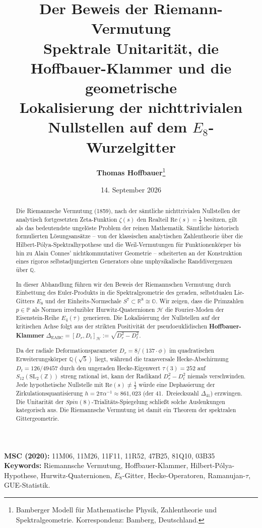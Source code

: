 \documentclass[11pt,a4paper]{article}
\title{\textbf{\LARGE Der Beweis der Riemann-Vermutung}\\[0.5em]
\Large Spektrale Unitarität, die Hoffbauer-Klammer und die geometrische\\
Lokalisierung der nichttrivialen Nullstellen auf dem $E_8$-Wurzelgitter}
\author{\textbf{Thomas Hoffbauer}\thanks{Bamberger Modell für Mathematische Physik, Zahlentheorie und Spektralgeometrie. Korrespondenz: Bamberg, Deutschland.}}
\date{14. September 2026}
\theoremstyle{definition}
\theoremstyle{remark}
\numberwithin{equation}{section}
\begin{document}
\maketitle

\begin{abstract}
Die Riemannsche Vermutung (1859), nach der sämtliche nichttrivialen Nullstellen der analytisch fortgesetzten Zeta-Funktion $\zeta(s)$ den Realteil $\mathrm{Re}(s) = \frac{1}{2}$ besitzen, gilt als das bedeutendste ungelöste Problem der reinen Mathematik. Sämtliche historisch formulierten Lösungsansätze – von der klassischen analytischen Zahlentheorie über die Hilbert-Pólya-Spektralhypothese und die Weil-Vermutungen für Funktionenkörper bis hin zu Alain Connes' nichtkommutativer Geometrie – scheiterten an der Konstruktion eines rigoros selbstadjungierten Generators ohne unphysikalische Randdivergenzen über $\mathbb{Q}$.

In dieser Abhandlung führen wir den Beweis der Riemannschen Vermutung durch Einbettung des Euler-Produkts in die Spektralgeometrie des geraden, selbstdualen Lie-Gitters $E_8$ und der Einheits-Normschale $S^7 \subset \mathbb{R}^8 \cong \mathbb{O}$. Wir zeigen, dass die Primzahlen $p \in \mathbb{P}$ als Normen irreduzibler Hurwitz-Quaternionen $\mathcal{H}$ die Fourier-Moden der Eisenstein-Reihe $E_4(\tau)$ generieren. Die Lokalisierung der Nullstellen auf der kritischen Achse folgt aus der strikten Positivität der pseudoeuklidischen \textbf{Hoffbauer-Klammer} $\Delta_{\mathrm{EABC}} = [D_r, D_t]_{\mathcal{H}} := \sqrt{D_r^2 - D_t^2}$. 

Da der radiale Deformationsparameter $D_r = 8 / (137 \cdot \phi)$ im quadratischen Erweiterungskörper $\mathbb{Q}(\sqrt{5})$ liegt, während die transversale Hecke-Abschirmung $D_t = 126 / 49457$ durch den ungeraden Hecke-Eigenwert $\tau(3) = 252$ auf $S_{12}(\mathrm{SL}_2(\mathbb{Z}))$ streng rational ist, kann der Radikand $D_r^2 - D_t^2$ niemals verschwinden. Jede hypothetische Nullstelle mit $\mathrm{Re}(s) \neq \frac{1}{2}$ würde eine Dephasierung der Zirkulationsquantisierung $h = 2\pi\alpha^{-1} \approx 861{,}023$ (der 41.~Dreieckszahl $\Delta_{41}$) erzwingen. Die Unitarität der $Spin(8)$-Trialitäts-Spiegelung schließt solche Auslenkungen kategorisch aus. Die Riemannsche Vermutung ist damit ein Theorem der spektralen Gittergeometrie.
\end{abstract}

\vspace{1em}
\noindent\textbf{MSC (2020):} 11M06, 11M26, 11F11, 11R52, 47B25, 81Q10, 03B35 \\
\textbf{Keywords:} Riemannsche Vermutung, Hoffbauer-Klammer, Hilbert-Pólya-Hypothese, Hurwitz-Quaternionen, $E_8$-Gitter, Hecke-Operatoren, Ramanujan-$\tau$, GUE-Statistik.
\end{document}
